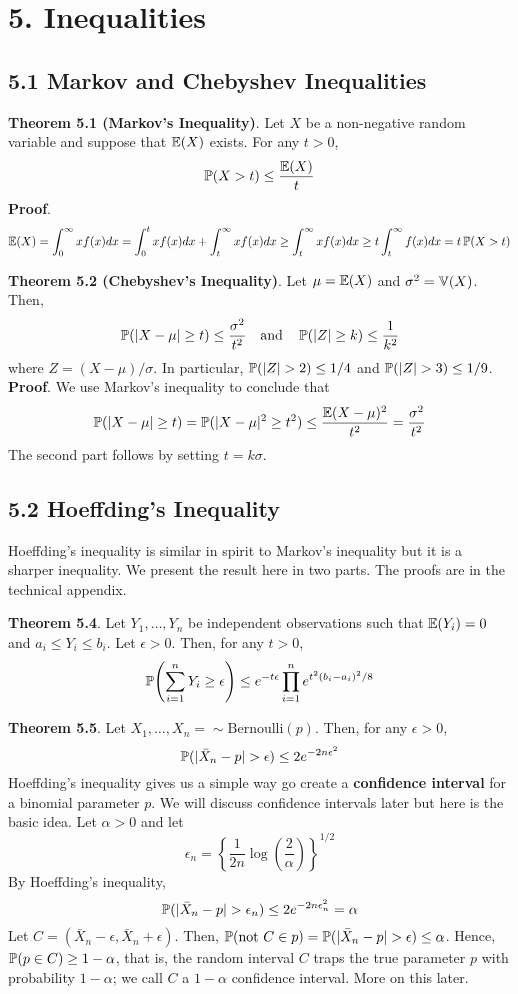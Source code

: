 \section*{5. Inequalities}\label{inequalities}

\subsection*{5.1 Markov and Chebyshev
Inequalities}\label{markov-and-chebyshev-inequalities}

\textbf{Theorem 5.1 (Markov's Inequality)}. Let \(X\) be a non-negative
random variable and suppose that \(\operatorname{\mathbb{E}}(X)\) exists. For any
\(t > 0\),
\[
\operatorname{\mathbb{P}}(X > t) \leq \frac{\operatorname{\mathbb{E}}(X)}{t}
\]
\textbf{Proof}.
\[
\operatorname{\mathbb{E}}(X)
=\int_{0}^{\infty} xf(x) dx
=\int_{0}^t xf(x) dx + \int_t^{\infty} xf(x) dx
\geq \int_t^{\infty} xf(x) dx
\geq t \int_t^{\infty} f(x) dx
= t \operatorname{\mathbb{P}}(X > t)
\]

\textbf{Theorem 5.2 (Chebyshev's Inequality)}. Let
\(\mu = \operatorname{\mathbb{E}}(X)\) and \(\sigma^{2} = \operatorname{\mathbb{V}}(X)\). Then,
\[
\operatorname{\mathbb{P}}(|X - \mu| \geq t) \leq \frac{\sigma^{2}}{t^{2}} 
\quad \text{and} \quad
\operatorname{\mathbb{P}}(|Z| \geq k) \leq \frac{1}{k^{2}}
\]
where \(Z = (X - \mu) / \sigma\). In particular,
\(\operatorname{\mathbb{P}}(|Z| > 2) \leq 1/4\) and \(\operatorname{\mathbb{P}}(|Z| > 3) \leq 1/9\).
\textbf{Proof}. We use Markov's inequality to conclude that
\[
\operatorname{\mathbb{P}}(|X - \mu| \geq t) = \operatorname{\mathbb{P}}(|X - \mu|^{2} \geq t^{2}) \leq \frac{\operatorname{\mathbb{E}}(X - \mu)^{2}}{t^{2}} = \frac{\sigma^{2}}{t^{2}}
\]
The second part follows by setting \(t = k \sigma\).

\subsection*{5.2 Hoeffding's Inequality}\label{hoeffdings-inequality}
Hoeffding's inequality is similar in spirit to Markov's inequality but
it is a sharper inequality. We present the result here in two parts. The
proofs are in the technical appendix.

\textbf{Theorem 5.4}. Let \(Y_{1}, \dots, Y_{n}\) be independent
observations such that \(\operatorname{\mathbb{E}}(Y_{i}) = 0\) and
\(a_{i} \leq Y_{i} \leq b_{i}\). Let \(\epsilon > 0\). Then, for any
\(t > 0\),
\[
\PROB\left( \sum_{i=1}^{n} Y_{i} \geq \epsilon \right) \leq e^{-t\epsilon} \prod_{i=1}^{n} e^{t^{2}(b_{i} - a_{i})^{2} / 8}
\]

\textbf{Theorem 5.5}. Let \(X_{1}, \dots, X_n = \sim \text{Bernoulli}(p)\).
Then, for any \(\epsilon > 0\),
\[
\operatorname{\mathbb{P}}(|\bar{X}_{n} - p| > \epsilon) \leq 2e^{-2n\epsilon^{2}}
\]
Hoeffding's inequality gives us a simple way go create a
\textbf{confidence interval} for a binomial parameter \(p\). We will
discuss confidence intervals later but here is the basic idea. Let
\(\alpha > 0\) and let
\[
\epsilon_{n} = \left\{ \frac{1}{2n} \log \left( \frac{2}{\alpha} \right) \right\}^{1/2}
\]
By Hoeffding's inequality,
\[
\operatorname{\mathbb{P}}(|\bar{X}_{n} - p| > \epsilon_{n}) \leq 2e^{-2n\epsilon_{n}^{2}} = \alpha
\]
Let \(C = (\bar{X}_{n} - \epsilon, \bar{X}_{n} + \epsilon)\).
Then,
\(\operatorname{\mathbb{P}}(\text{not } C \in p) = \operatorname{\mathbb{P}}(|\bar{X}_{n} - p| > \epsilon) \leq \alpha\).
Hence, \(\operatorname{\mathbb{P}}(p \in C) \geq 1 - \alpha\), that is, the random
interval \(C\) traps the true parameter \(p\) with probability
\(1 - \alpha\); we call \(C\) a \(1 - \alpha\) confidence interval. More
on this later.

